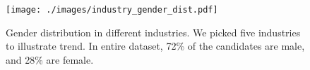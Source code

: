 \begin{figure}[!t]
    \centering
    \texttt{[image: ./images/industry\_gender\_dist.pdf]}
    \caption{Gender distribution in different industries. We picked five industries to illustrate trend. In entire dataset, 72\% of the candidates are male, and 28\% are female.
    }
    \label{fig:dset_gender_dist}
\end{figure}
